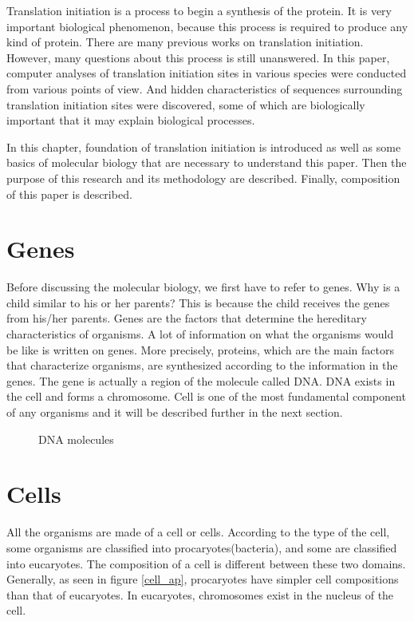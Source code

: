 
Translation initiation is a process to begin a synthesis of the
protein.  It is very important biological phenomenon, because this
process is required to produce any kind of protein. There are many
previous works on translation initiation. However, many questions
about this process is still unanswered. In this paper, computer
analyses of translation initiation sites in various species were
conducted from various points of view. And hidden characteristics of 
sequences surrounding translation initiation sites were discovered,
some of which are biologically important that it may explain
biological processes.

In this chapter, foundation of translation initiation is introduced as
well as some basics of molecular biology that are necessary to
understand this paper. Then the purpose of this research and its
methodology are described. Finally, composition of this paper is
described.


\section{Genes}

Before discussing the molecular biology, we first have to refer to
genes.  Why is a child similar to his or her parents? This is because
the child receives the genes from his/her parents.  Genes are the
factors that determine the hereditary characteristics of organisms. A
lot of information on what the organisms would be like is written on
genes. More precisely, proteins, which are the main factors that
characterize organisms, are synthesized according to the information in
the genes.  The gene is actually a region of the molecule called
DNA. DNA exists in the cell and forms a chromosome. Cell is one of the
most fundamental component of any organisms and it will be described
further in the next section.

\begin{figure}
\begin{center}
\end{center}
\caption{DNA molecules}
\label{dna}
\end{figure}

\section{Cells}
\label{cell}

All the organisms are made of a cell or cells. According to the type of
the cell, some organisms are classified into procaryotes(bacteria), and
some are classified into eucaryotes.  The composition of a cell is
different between these two domains. Generally, as seen in figure
\ref{cell_ap}, procaryotes have simpler cell compositions than that of
eucaryotes. In eucaryotes, chromosomes exist in the nucleus of the cell.

